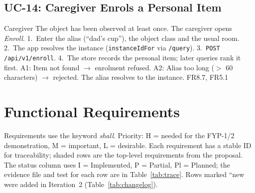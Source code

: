 \subsection{UC-14: Caregiver Enrols a Personal Item }
{Caregiver}
{The object has been observed at least once.}
{The caregiver opens \emph{Enroll}.}
{1.~Enter the alias (``dad's cup''), the object class and the usual room.
2.~The app resolves the instance (\texttt{instanceIdFor} via \texttt{/query}).
3.~\texttt{POST /api/v1/enroll}. 4.~The store records the personal item; later
queries rank it first.}
{A1: Item not found $\rightarrow$ enrolment refused. A2: Alias too long ($>$ 60
characters) $\rightarrow$ rejected.}
{The alias resolves to the instance.}
{FR8.7, FR5.1}

\section{Functional Requirements}
\label{sec:frs}
Requirements use the keyword \emph{shall}. Priority: H = needed for the FYP-1/2
demonstration, M = important, L = desirable. Each requirement has a stable ID
for
traceability; shaded rows are the top-level requirements from the proposal.
The status column uses I = Implemented, P = Partial, Pl = Planned; the evidence
file and test for each row are in Table~\ref{tab:trace}. Rows marked
``new were added in Iteration~2 (Table~\ref{tab:changelog}).

